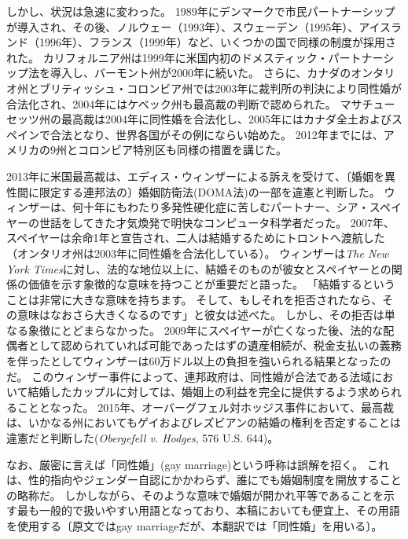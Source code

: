 \documentclass[paper=a4,book,openany]{jlreq}
\begin{document}
しかし、状況は急速に変わった。
1989年にデンマークで市民パートナーシップが導入され、その後、ノルウェー（1993年）、スウェーデン（1995年）、アイスランド（1996年）、フランス（1999年）など、いくつかの国で同様の制度が採用された。
カリフォルニア州は1999年に米国内初のドメスティック・パートナーシップ法を導入し、バーモント州が2000年に続いた。
さらに、カナダのオンタリオ州とブリティッシュ・コロンビア州では2003年に裁判所の判決により同性婚が合法化され、2004年にはケベック州も最高裁の判断で認められた。
マサチューセッツ州の最高裁は2004年に同性婚を合法化し、2005年にはカナダ全土およびスペインで合法となり、世界各国がその例にならい始めた。
2012年までには、アメリカの9州とコロンビア特別区も同様の措置を講じた。

2013年に米国最高裁は、エディス・ウィンザーによる訴えを受けて、〔婚姻を異性間に限定する連邦法の〕婚姻防衛法(DOMA法)の一部を違憲と判断した。
ウィンザーは、何十年にもわたり多発性硬化症に苦しむパートナー、シア・スペイヤーの世話をしてきた才気煥発で明快なコンピュータ科学者だった。
2007年、スペイヤーは余命1年と宣告され、二人は結婚するためにトロントへ渡航した（オンタリオ州は2003年に同性婚を合法化している）。
ウィンザーは\emph{The New York Times}に対し、法的な地位以上に、結婚そのものが彼女とスペイヤーとの関係の価値を示す象徴的な意味を持つことが重要だと語った。
「結婚するということは非常に大きな意味を持ちます。
そして、もしそれを拒否されたなら、その意味はなおさら大きくなるのです」と彼女は述べた。
しかし、その拒否は単なる象徴にとどまらなかった。
2009年にスペイヤーが亡くなった後、法的な配偶者として認められていれば可能であったはずの遺産相続が、税金支払いの義務を伴ったとしてウィンザーは60万ドル以上の負担を強いられる結果となったのだ\citep{applebome12:_revel_her_suprem_court_momen}。
このウィンザー事件によって、連邦政府は、同性婚が合法である法域において結婚したカップルに対しては、婚姻上の利益を完全に提供するよう求められることとなった。
2015年、オーバーグフェル対ホッジス事件において、最高裁は、いかなる州においてもゲイおよびレズビアンの結婚の権利を否定することは違憲だと判断した(\emph{Obergefell v. Hodges}, 576 U.S. 644)。

なお、厳密に言えば「同性婚」(gay marriage)という呼称は誤解を招く。
これは、性的指向やジェンダー自認にかかわらず、誰にでも婚姻制度を開放することの略称だ。
しかしながら、そのような意味で婚姻が開かれ平等であることを示す最も一般的で扱いやすい用語となっており、本稿においても便宜上、その用語を使用する〔原文ではgay marriageだが、本翻訳では「同性婚」を用いる〕。
\end{document}
